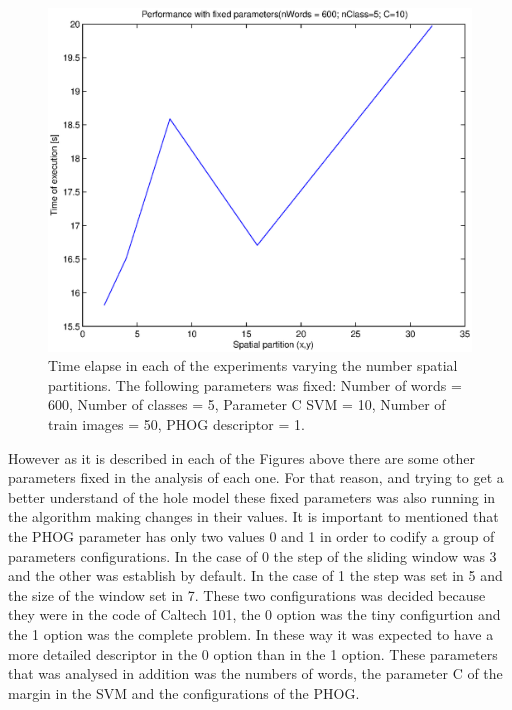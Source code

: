 \documentclass[10pt,twocolumn,letterpaper]{article}
\begin{document}
\begin{figure}[h]
\begin{center}
\includegraphics[width=1\linewidth]{images/nSpatial2.eps}
\end{center}
   \caption{
Time elapse in each of the experiments varying the number spatial partitions. The following parameters was fixed: Number of words = 600, Number of classes = 5, Parameter C SVM = 10, Number of train images = 50, PHOG descriptor = 1.
   }
\label{nSpatial2}
\end{figure}

However as it is described in each of the Figures above there are some other parameters fixed in the analysis of each one. For that reason, and trying to get a better understand of the hole model these fixed parameters was also running in the algorithm making changes in their values. It is important to mentioned that the PHOG parameter has only two values 0 and 1 in order to codify a group of parameters configurations. In the case of 0 the step of the sliding window was 3 and the other was establish by default. In the case of 1 the step was set in 5 and the size of the window set in 7. These two configurations was decided because they were in the code of Caltech 101, the 0 option was the tiny configurtion and the 1 option was the complete problem. In these way it was expected to have a more detailed descriptor in the 0 option than in the 1 option. These parameters that was analysed in addition was the numbers of words, the parameter C of the margin in the SVM and the configurations of the PHOG.
\end{document}
